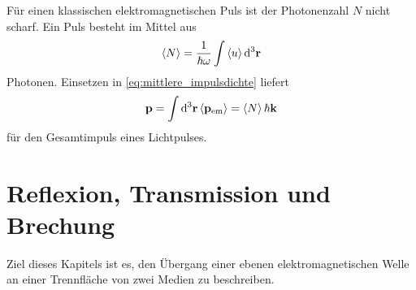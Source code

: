 Für einen klassischen elektromagnetischen Puls ist der Photonenzahl $N$ nicht scharf. Ein Puls besteht im Mittel aus 
\begin{align*}
    \left\langle N\right\rangle = \frac{1}{\hbar\omega} \int \left\langle u\right\rangle \diffa[3]{\vec r}
\end{align*}
Photonen. Einsetzen in \eqref{eq:mittlere_impulsdichte} liefert 
\begin{align*}
    \vec p = \int\diffa[3]{\vec r}\left\langle\vec p_\mathrm{em}\right\rangle = \left\langle N\right\rangle \hbar\vec k
\end{align*}
für den Gesamtimpuls eines Lichtpulses. 




\section{Reflexion, Transmission und Brechung}

Ziel dieses Kapitels ist es, den Übergang einer ebenen elektromagnetischen Welle an einer Trennfläche von zwei Medien zu beschreiben. 
